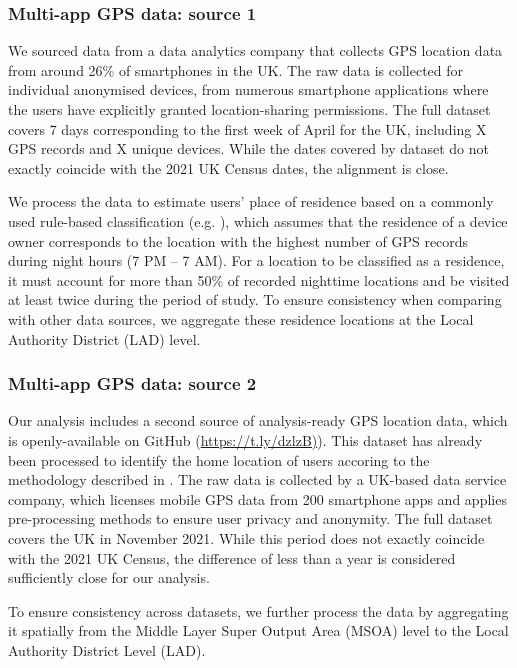 \documentclass[]{rsos}%
\begin{document}
\subsubsection{Multi-app GPS data: source 1}\label{multi-app-gps-data-source-1}

We sourced data from a data analytics company that collects GPS location
data from around 26\% of smartphones in the UK. The raw data is collected
for individual anonymised devices, from numerous smartphone applications
where the users have explicitly granted location-sharing permissions.
The full dataset covers 7 days corresponding to the first week of April
for the UK, including X GPS records and X unique devices. While the
dates covered by dataset do not exactly coincide with the 2021 UK Census
dates, the alignment is close.

We process the data to estimate users' place of residence based on a
commonly used rule-based classification (e.g. \citep[@zhong24working]{wang2022}), which assumes that the residence of a device owner
corresponds to the location with the highest number of GPS records
during night hours (7 PM -- 7 AM). For a location to be classified as a
residence, it must account for more than 50\% of recorded nighttime
locations and be visited at least twice during the period of study. To
ensure consistency when comparing with other data sources, we aggregate
these residence locations at the Local Authority District (LAD) level.

\subsubsection{Multi-app GPS data: source 2}\label{multi-app-gps-data-source-2}

Our analysis includes a second source of analysis-ready GPS location
data, which is openly-available on GitHub
(\href{https://t.ly/dzlzB}{https://t.ly/dzlzB)}). This dataset has already
been processed to identify the home location of users accoring to the
methodology described in \citep{zhong24working}. The raw data is collected by
a UK-based data service company, which licenses mobile GPS data from 200
smartphone apps and applies pre-processing methods to ensure user
privacy and anonymity. The full dataset covers the UK in November 2021.
While this period does not exactly coincide with the 2021 UK Census, the
difference of less than a year is considered sufficiently close for our
analysis.

To ensure consistency across datasets, we further process the data by
aggregating it spatially from the Middle Layer Super Output Area (MSOA)
level to the Local Authority District Level (LAD).
\end{document}
